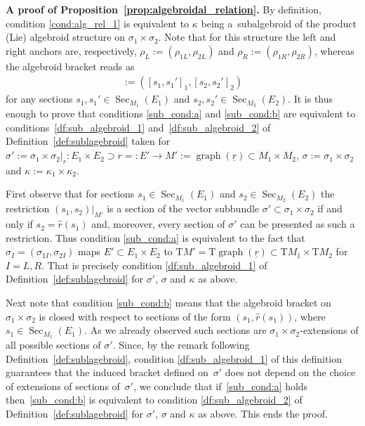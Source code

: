 \documentclass[10pt,a4paper]{amsart}
\newcommand{\wh}[1]{\widehat{#1}} %
\newcommand{\und}{\underline}
\newcommand{\graf}{\operatorname{graph}}
\newcommand{\Sec}{\operatorname{Sec}}
\newcommand{\ra}{\rightarrow}
\newcommand{\rhoL}{\rho_L} %
\newcommand{\rhoR}{\rho_R}
\newcommand{\T}{\mathrm{T}} %
\numberwithin{equation}{section}
\theoremstyle{definition}
\begin{document}
{\bf A proof of Proposition~\ref{prop:algebroidal_relation}.} %
By definition{,} condition \eqref{cond:alg_rel_1} is equivalent to $\kappa$ being a~subalgebroid of the product (Lie) algebroid structure on $\sigma_1\times\sigma_2$. Note that for this structure the left and right anchors are, respectively, $\rhoL:=(\rho_{1L},\rho_{2L})$ and $\rhoR:= (\rho_{1R},\rho_{2R})$, whereas the algebroid bracket reads as
\begin{gather*}[(s_1,s_2),(s_1',s_2')]:=([s_1,s_1']_1,[s_2,s_2']_2)\end{gather*}
for any sections $s_1,s_1'\in\Sec_{M_1}(E_1)$ and $s_2,s_2'\in\Sec_{M_2}(E_2)$. It is thus enough to prove that conditions \eqref{sub_cond:a} and \eqref{sub_cond:b} are equivalent to conditions~\eqref{df:sub_algebroid_1} and~\eqref{df:sub_algebroid_2} of Definition~\ref{def:sublagebroid} taken for $\sigma':=\sigma_1\times\sigma_2|_r\colon E_1\times E_2\supset r=:E'\ra M':=\graf(\und{r})\subset M_1\times M_2$, $\sigma:=\sigma_1\times \sigma_2$ and $\kappa:=\kappa_1\times\kappa_2$.

First observe that for sections $s_1\in \Sec_{M_1}(E_1)$ and $s_2\in \Sec_{M_2}(E_2)$ the restriction $(s_1, s_2)|_{M'}$ is a section of the vector subbundle $\sigma'\subset \sigma_1\times \sigma_2$ if and only if $s_2=\hat{r}(s_1)$ and, moreover, every section of $\sigma'$ can be presented as such a restriction. Thus condition \eqref{sub_cond:a} is equivalent to the fact that $\sigma_I=(\sigma_{1I},\sigma_{2I})$ maps $E'\subset E_1\times E_2$ to $\T M'=\T\graf(\und{r})\subset\T M_1\times \T M_2$ for $I=L,R$. That is precisely condition \eqref{df:sub_algebroid_1} of Definition~\ref{def:sublagebroid} for $\sigma'$, $\sigma$ and $\kappa$ as above.

Next note that condition \eqref{sub_cond:b} means that the algebroid bracket on $\sigma_1\times\sigma_2$ is closed with respect to sections of the form $(s_1,\wh{r}(s_1))$, where $s_1\in\Sec_{M_1}(E_1)$. As we already observed such sections are $\sigma_1\times\sigma_2$-extensions of all possible sections of $\sigma'$. Since, by the remark following Definition~\ref{def:sublagebroid}, condition \eqref{df:sub_algebroid_1} of this definition guarantees that the induced bracket defined on~$\sigma'$ does not depend on the choice of extensions of sections of~$\sigma'$, we conclude that if~\eqref{sub_cond:a} holds then~\eqref{sub_cond:b} is equivalent to condition \eqref{df:sub_algebroid_2} of Definition~\ref{def:sublagebroid} for $\sigma'$, $\sigma$ and $\kappa$ as above. This ends the proof. %
\end{document}
